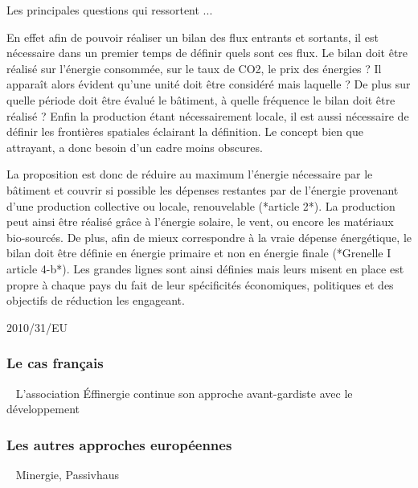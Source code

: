 Les principales questions qui ressortent ...


En effet afin de pouvoir réaliser un bilan des flux entrants et
sortants, il est nécessaire dans un premier temps de définir quels sont ces flux. Le bilan
doit être réalisé sur l’énergie consommée, sur le taux de CO2, le prix des énergies ? Il
apparaît alors évident qu’une unité doit être considéré mais laquelle ? De plus sur quelle
période doit être évalué le bâtiment, à quelle fréquence le bilan doit être réalisé ?
Enfin la production étant nécessairement locale, il est aussi nécessaire de définir
les frontières spatiales éclairant la définition. Le concept bien que attrayant,
a donc besoin d’un cadre moins obscures.



La proposition est donc de réduire au maximum l’énergie nécessaire par le bâtiment
et couvrir si possible les dépenses restantes par de l’énergie provenant d’une
production collective ou locale, renouvelable (*article 2*). La production peut ainsi
être réalisé grâce à l’énergie solaire, le vent, ou encore les matériaux bio-sourcés.
De plus, afin de mieux correspondre à la vraie dépense énergétique, le bilan doit être
définie en énergie primaire et non en énergie finale (*Grenelle I article 4-b*).
Les grandes lignes sont ainsi définies mais leurs misent en place est propre à chaque pays
du fait de leur spécificités économiques, politiques et des objectifs de réduction les engageant.

2010/31/EU


\subsubsection{Le cas français} %
\label{ssub:le_cas_francais}
~
L’association Éffinergie continue son approche avant-gardiste avec le développement



\subsubsection{Les autres approches européennes} %
\label{ssub:les_autres_approches_europeennes}
~
Minergie, Passivhaus



